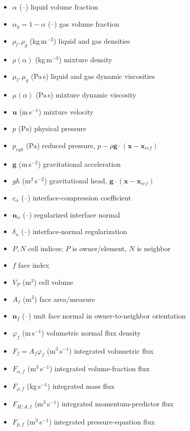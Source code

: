 \documentclass[11pt]{article}
\begin{document}
\begin{itemize}[leftmargin=2.5em]
  \item \(\alpha\) (--) liquid volume fraction
  \item \(\alpha_g=1-\alpha\) (--) gas volume fraction
  \item \(\rho_l,\rho_g\) (kg\,m\(^{-3}\)) liquid and gas densities
  \item \(\rho(\alpha)\) (kg\,m\(^{-3}\)) mixture density
  \item \(\mu_l,\mu_g\) (Pa\,s) liquid and gas dynamic viscosities
  \item \(\mu(\alpha)\) (Pa\,s) mixture dynamic viscosity
  \item \(\mathbf{u}\) (m\,s\(^{-1}\)) mixture velocity
  \item \(p\) (Pa) physical pressure
  \item \(p_{rgh}\) (Pa) reduced pressure, \(p-\rho\mathbf{g}\cdot(\mathbf{x}-\mathbf{x}_{ref})\)
  \item \(\mathbf{g}\) (m\,s\(^{-2}\)) gravitational acceleration
  \item \(gh\) (m\(^2\)\,s\(^{-2}\)) gravitational head, \(\mathbf{g}\cdot(\mathbf{x}-\mathbf{x}_{ref})\)
  \item \(c_\alpha\) (--) interface-compression coefficient
  \item \(\mathbf{n}_{\alpha}\) (--) regularized interface normal
  \item \(\delta_n\) (--) interface-normal regularization
  \item \(P,N\) cell indices; \(P\) is owner/element, \(N\) is neighbor
  \item \(f\) face index
  \item \(V_P\) (m\(^3\)) cell volume
  \item \(A_f\) (m\(^2\)) face area/measure
  \item \(\mathbf{n}_f\) (--) unit face normal in owner-to-neighbor orientation
  \item \(\varphi_f\) (m\,s\(^{-1}\)) volumetric normal flux density
  \item \(F_f=A_f\varphi_f\) (m\(^3\)\,s\(^{-1}\)) integrated volumetric flux
  \item \(F_{\alpha,f}\) (m\(^3\)\,s\(^{-1}\)) integrated volume-fraction flux
  \item \(F_{\rho,f}\) (kg\,s\(^{-1}\)) integrated mass flux
  \item \(F_{H/A,f}\) (m\(^3\)\,s\(^{-1}\)) integrated momentum-predictor flux
  \item \(F_{p,f}\) (m\(^3\)\,s\(^{-1}\)) integrated pressure-equation flux

\end{itemize}
\end{document}
